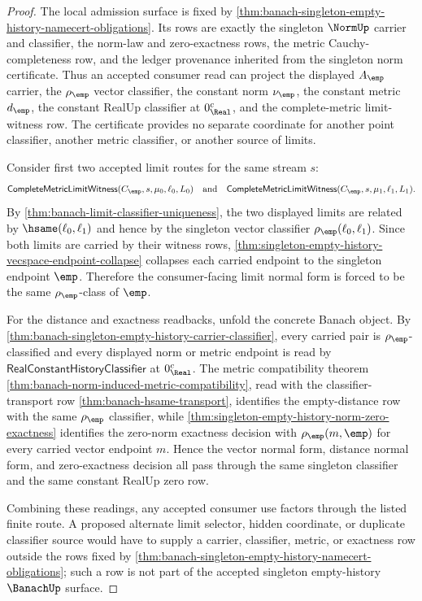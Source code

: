 \begin{proof}
The local admission surface is fixed by
\autoref{thm:banach-singleton-empty-history-namecert-obligations}. Its rows are
exactly the singleton $\NormUp$ carrier and classifier, the norm-law and
zero-exactness rows, the metric Cauchy-completeness row, and the ledger
provenance inherited from the singleton norm certificate. Thus an accepted
consumer read can project the displayed $A_{\emp}$ carrier, the
$\rho_{\emp}$ vector classifier, the constant norm $\nu_{\emp}$, the constant
metric $d_{\emp}$, the constant RealUp classifier at
$0_{\Real}^{c}$, and the complete-metric limit-witness row. The
certificate provides no separate coordinate for another point classifier,
another metric classifier, or another source of limits.

Consider first two accepted limit routes for the same stream $s$:
$$
\mathsf{CompleteMetricLimitWitness}(C_{\emp},s,\mu_0,\ell_0,L_0)
\quad\text{and}\quad
\mathsf{CompleteMetricLimitWitness}(C_{\emp},s,\mu_1,\ell_1,L_1).
$$
By \autoref{thm:banach-limit-classifier-uniqueness}, the two displayed limits
are related by $\hsame(\ell_0,\ell_1)$ and hence by the singleton vector
classifier $\rho_{\emp}(\ell_0,\ell_1)$. Since both limits are carried by their
witness rows, \autoref{thm:singleton-empty-history-vecspace-endpoint-collapse}
collapses each carried endpoint to the singleton endpoint $\emp$. Therefore
the consumer-facing limit normal form is forced to be the same
$\rho_{\emp}$-class of $\emp$.

For the distance and exactness readbacks, unfold the concrete Banach object.
By \autoref{thm:banach-singleton-empty-history-carrier-classifier}, every
carried pair is $\rho_{\emp}$-classified and every displayed norm or metric
endpoint is read by
$\mathsf{RealConstantHistoryClassifier}$ at $0_{\Real}^{c}$. The metric
compatibility theorem \autoref{thm:banach-norm-induced-metric-compatibility},
read with the classifier-transport row \autoref{thm:banach-hsame-transport},
identifies the empty-distance row with the same $\rho_{\emp}$ classifier, while
\autoref{thm:singleton-empty-history-norm-zero-exactness} identifies the
zero-norm exactness decision with $\rho_{\emp}(m,\emp)$ for every carried
vector endpoint $m$. Hence the vector normal form, distance normal form, and
zero-exactness decision all pass through the same singleton classifier and the
same constant RealUp zero row.

Combining these readings, any accepted consumer use factors through the listed
finite route. A proposed alternate limit selector, hidden coordinate, or
duplicate classifier source would have to supply a carrier, classifier,
metric, or exactness row outside the rows fixed by
\autoref{thm:banach-singleton-empty-history-namecert-obligations}; such a row
is not part of the accepted singleton empty-history $\BanachUp$ surface.
\end{proof}
